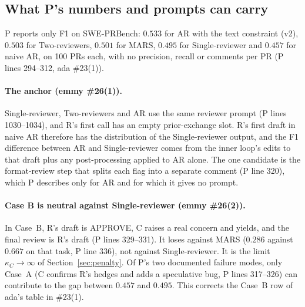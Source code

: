 \documentclass{article}
\begin{document}
\subsection{What P's numbers and prompts can carry}\label{sec:table2}

P reports only F1 on SWE-PRBench: $0.533$ for AR with the text
constraint (v2), $0.503$ for Two-reviewers, $0.501$ for MARS, $0.495$ for
Single-reviewer and $0.457$ for naive AR, on 100 PRs each, with no
precision, recall or comments per PR (P lines 294--312, ada \#23(1)).

\paragraph{The anchor (emmy \#26(1)).} Single-reviewer, Two-reviewers and
AR use the same reviewer prompt (P lines 1030--1034), and R's first call
has an empty prior-exchange slot. R's first draft in naive AR therefore
has the distribution of the Single-reviewer output, and the F1 difference
between AR and Single-reviewer comes from the inner loop's edits to that
draft plus any post-processing applied to AR alone. The one candidate is
the format-review step that splits each flag into a separate comment
(P line 320), which P describes only for AR and for which it gives no
prompt.

\paragraph{Case B is neutral against Single-reviewer (emmy \#26(2)).} In
Case~B, R's draft is APPROVE, C raises a real concern and yields, and the
final review is R's draft (P lines 329--331). It loses against MARS
($0.286$ against $0.667$ on that task, P line 336), not against
Single-reviewer. It is the limit $\kappa_C\to\infty$ of
Section~\ref{sec:penalty}. Of P's two documented failure modes, only
Case~A (C confirms R's hedges and adds a speculative bug, P lines
317--326) can contribute to the gap between $0.457$ and $0.495$. This
corrects the Case~B row of ada's table in \#23(1).
\end{document}
